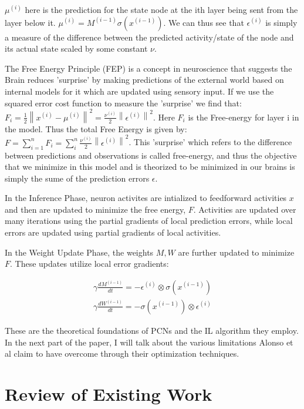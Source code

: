 \documentclass{article}
\theoremstyle{plain}
\theoremstyle{definition}
\theoremstyle{remark}
\begin{document}
\(\mu^{(i)}\) here is the prediction for the state node at the ith layer being sent from the 
layer below it. \(\mu^{(i)} = M^{(i-1)} \sigma(x^{(i-1)}) \label{eq:4}\).
We can thus see that \(\epsilon^{(i)}\) is simply a measure of the difference between the predicted
activity/state of the node and its actual state scaled by some constant \(\nu\).

The Free Energy Principle (FEP) is a concept in neuroscience that suggests 
the Brain reduces 'surprise' by making predictions of the external world 
based on internal models for it which are updated using sensory input. If we use 
the squared error cost function to measure the 'surprise' we find that:
\(F_i  = \frac{1}{2}\left\| x^{(i)} - \mu^{(i)}\right\|^2 
= \frac{\nu^{(i)}}{2}\left\| \epsilon^{(i)} \right\|^2 \).
Here \(F_i\) is the Free-energy for layer i in the model. Thus the total Free Energy
is given by: \( F = \sum_{i=1}^{n} F_i = \sum_{i}^{n} \frac{\nu^{(i)}}{2}\left\| \epsilon^{(i)} \right\|^2\). 
This 'surprise' which refers to the difference between predictions and observations is 
called free-energy, and thus the objective that we minimize in this model and is theorized to be minimized 
in our brains is simply the sume of the prediction errors \(\epsilon\).

In the Inference Phase, neuron activites are intialized to feedforward activities \(x\) and then 
are updated to minimize the free energy, \(F\). Activities are updated over many iterations using 
the partial gradients of local prediction errors, while local errors are updated using partial 
gradients of local activities. 

In the Weight Update Phase, the weights \(M, W\) are further updated to minimize \(F\). These updates
utilize local error gradients: 

\begin{align}
    \gamma \frac{dM^{(i-1)}}{dt} = -\epsilon^{(i)} \otimes \sigma{(x^{(i-1)})} \\
    \gamma \frac{dW^{(i-1)}}{dt} = -\sigma{(x^{(i-1)})} \otimes \epsilon^{(i)}
\end{align}

These are the theoretical foundations of PCNs and the IL algorithm they employ.
In the next part of the paper, I will talk about the various limitations Alonso et al
claim to have overcome through their optimization techniques.

\section{Review of Existing Work}
\end{document}
